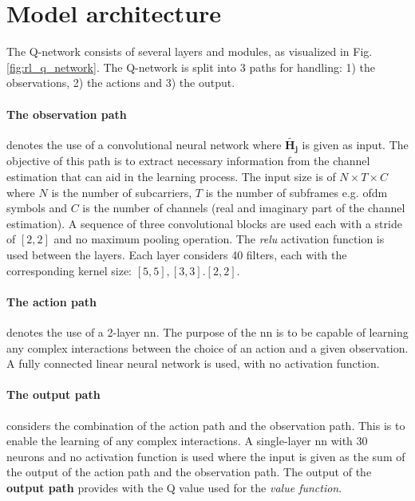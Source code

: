 \section{Model architecture}
The Q-network consists of several layers and modules, as visualized in Fig. \ref{fig:rl_q_network}. The Q-network is split into 3 paths for handling: 1) the observations, 2) the actions and 3) the output. 

\paragraph{The \textbf{observation path}} denotes the use of a convolutional neural network where $\widetilde{\mathbf{H_j}}$ is given as input. The objective of this path is to extract necessary information from the channel estimation that can aid in the learning process. The input size is of $N \times T \times C$ where $N$ is the number of subcarriers, $T$ is the number of subframes e.g. \gls{ofdm} symbols and $C$ is the number of channels (real and imaginary part of the channel estimation). A sequence of three convolutional blocks are used each with a stride of $[2, 2]$ and no maximum pooling operation. The \textit{\gls{relu}} activation function is used between the layers. Each layer considers 40 filters, each with the corresponding kernel size: $[5,5], [3,3]. [2,2]$. 

\paragraph{The \textbf{action path}} denotes the use of a 2-layer \gls{nn}. The purpose of the \gls{nn} is to be capable of learning any complex interactions between the choice of an action and a given observation. A fully connected linear neural network is used, with no activation function. 

\paragraph{The \textbf{output path}} considers the combination of the action path and the observation path. This is to enable the learning of any complex interactions. A single-layer \gls{nn} with $30$ neurons and no activation function is used where the input is given as the sum of the output of the action path and the observation path. The output of the \textbf{output path} provides with the Q value used for the \textit{value function}. 

